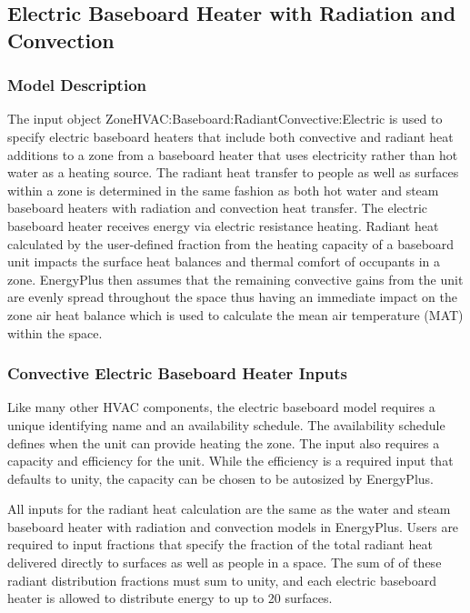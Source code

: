 \subsection{Electric Baseboard Heater with Radiation and Convection}\label{electric-baseboard-heater-with-radiation-and-convection}

\subsubsection{Model Description}\label{model-description-009}

The input object ZoneHVAC:Baseboard:RadiantConvective:Electric is used to specify electric baseboard heaters that include both convective and radiant heat additions to a zone from a baseboard heater that uses electricity rather than hot water as a heating source. The radiant heat transfer to people as well as surfaces within a zone is determined in the same fashion as both hot water and steam baseboard heaters with radiation and convection heat transfer. The electric baseboard heater receives energy via electric resistance heating. Radiant heat calculated by the user-defined fraction from the heating capacity of a baseboard unit impacts the surface heat balances and thermal comfort of occupants in a zone. EnergyPlus then assumes that the remaining convective gains from the unit are evenly spread throughout the space thus having an immediate impact on the zone air heat balance which is used to calculate the mean air temperature (MAT) within the space.

\subsubsection{Convective Electric Baseboard Heater Inputs}\label{convective-electric-baseboard-heater-inputs-000}

Like many other HVAC components, the electric baseboard model requires a unique identifying name and an availability schedule. The availability schedule defines when the unit can provide heating the zone. The input also requires a capacity and efficiency for the unit. While the efficiency is a required input that defaults to unity, the capacity can be chosen to be autosized by EnergyPlus.

All inputs for the radiant heat calculation are the same as the water and steam baseboard heater with radiation and convection models in EnergyPlus. Users are required to input fractions that specify the fraction of the total radiant heat delivered directly to surfaces as well as people in a space. The sum of of these radiant distribution fractions must sum to unity, and each electric baseboard heater is allowed to distribute energy to up to 20 surfaces.

